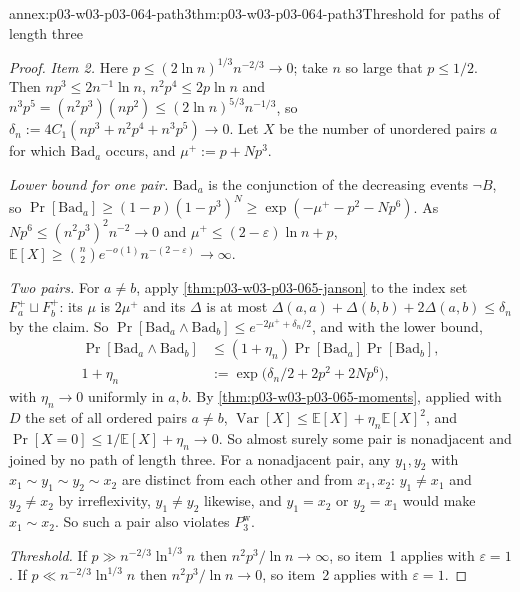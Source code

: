 \begin{annexitem}{annex:p03-w03-p03-064-path3}{thm:p03-w03-p03-064-path3}{Threshold for paths of length three}
\begin{proof}
\emph{Item 2.}  Here \(p\leq(2\ln n)^{1/3}n^{-2/3}\to0\); take \(n\) so large
that \(p\leq1/2\).  Then \(np^3\leq2n^{-1}\ln n\),
\(n^2p^4\leq2p\ln n\) and \(n^3p^5=(n^2p^3)(np^2)\leq
(2\ln n)^{5/3}n^{-1/3}\), so \(\delta_n:=4C_1(np^3+n^2p^4+n^3p^5)\to0\).
Let \(X\) be the number of unordered pairs \(a\) for which
\(\mathrm{Bad}_a\) occurs, and \(\mu^+:=p+Np^3\).

\emph{Lower bound for one pair.}  \(\mathrm{Bad}_a\) is the conjunction of
the decreasing events \(\neg B\), so
\(\Pr[\mathrm{Bad}_a]\geq(1-p)(1-p^3)^N\geq
\exp(-\mu^+-p^2-Np^6)\).  As \(Np^6\leq(n^2p^3)^2n^{-2}\to0\) and
\(\mu^+\leq(2-\varepsilon)\ln n+p\),
\(\mathbb E[X]\geq\binom n2e^{-o(1)}n^{-(2-\varepsilon)}\to\infty\).

\emph{Two pairs.}  For \(a\neq b\), apply \cref{thm:p03-w03-p03-065-janson}
to the index set \(F_a^+\sqcup F_b^+\): its \(\mu\) is \(2\mu^+\) and its
\(\Delta\) is at most \(\Delta(a,a)+\Delta(b,b)+2\Delta(a,b)\leq\delta_n\) by
the claim.  So \(\Pr[\mathrm{Bad}_a\wedge\mathrm{Bad}_b]\leq
e^{-2\mu^++\delta_n/2}\), and with the lower bound,
\begin{align*}
  \Pr[\mathrm{Bad}_a\wedge\mathrm{Bad}_b]&\leq(1+\eta_n)\Pr[\mathrm{Bad}_a]
  \Pr[\mathrm{Bad}_b],\\
  1+\eta_n&:=\exp\bigl(\delta_n/2+2p^2+2Np^6\bigr),
\end{align*}
with \(\eta_n\to0\) uniformly in \(a,b\).  By
\cref{thm:p03-w03-p03-065-moments}, applied with \(D\) the set of all ordered
pairs \(a\neq b\),
\(\operatorname{Var}[X]\leq\mathbb E[X]+\eta_n\mathbb E[X]^2\), and
\(\Pr[X=0]\leq1/\mathbb E[X]+\eta_n\to0\).  So almost surely some pair is
nonadjacent and joined by no path of length three.  For a nonadjacent pair,
any \(y_1,y_2\) with \(x_1\sim y_1\sim y_2\sim x_2\) are distinct from each
other and from \(x_1,x_2\): \(y_1\neq x_1\) and \(y_2\neq x_2\) by
irreflexivity, \(y_1\neq y_2\) likewise, and \(y_1=x_2\) or \(y_2=x_1\) would
make \(x_1\sim x_2\).  So such a pair also violates \(P_3^{\mathrm w}\).

\emph{Threshold.}  If \(p\gg n^{-2/3}\ln^{1/3}n\) then
\(n^2p^3/\ln n\to\infty\), so item~1 applies with \(\varepsilon=1\).  If
\(p\ll n^{-2/3}\ln^{1/3}n\) then \(n^2p^3/\ln n\to0\), so item~2 applies with
\(\varepsilon=1\).
\end{proof}
\end{annexitem}

